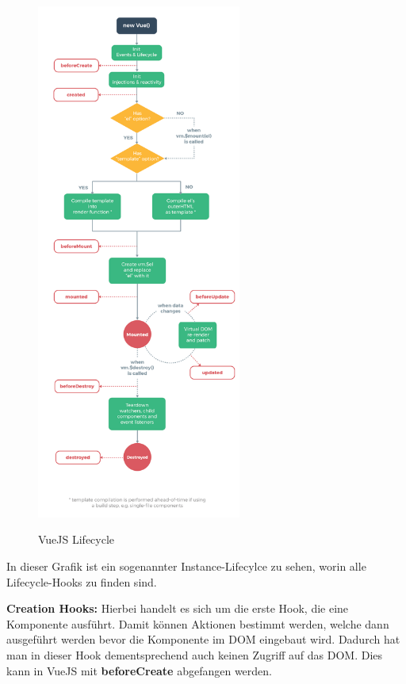 \newpage
\begin{figure}[h!]
    \centering
    \includegraphics[width=0.6\textwidth]{pics/vuejs-lifecycle.png}
    \caption{VueJS Lifecycle}
    \cite{frontend_web_vuejs_lifecycle}
    \label{fig:mesh1}
\end{figure}

In dieser Grafik ist ein sogenannter Instance-Lifecylce zu sehen, worin alle Lifecycle-Hooks zu finden sind.

\textbf{Creation Hooks:}
\newline
Hierbei handelt es sich um die erste Hook, die eine Komponente ausführt. Damit können Aktionen bestimmt werden, welche dann ausgeführt werden bevor die Komponente im DOM eingebaut wird. Dadurch hat man in dieser Hook dementsprechend auch keinen Zugriff auf das DOM.
Dies kann in VueJS mit \textbf{beforeCreate} abgefangen werden.

